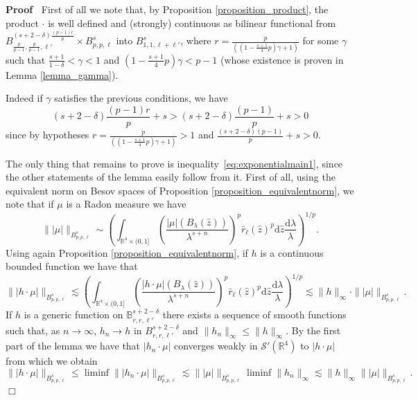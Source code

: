 \documentclass[a4paper,10pt]{article}
\newcommand{\mathd}{\mathrm{d}}
\newenvironment{proof}{\noindent\textbf{Proof\ }}{\hspace*{\fill}$\Box$\medskip}
\begin{document}
\begin{proof}
  First of all we note that, by Proposition \ref{proposition_product}, the
  product $\cdot$ is well defined and (strongly) continuous as bilinear
  functional from $B^{(s + 2 - \delta) \frac{(p - 1) r}{p}}_{\frac{p}{p - 1},
  \frac{p}{p - 1}, \ell'} \times B^s_{p, p, \ell}$ into $B^s_{1, 1, \ell +
  \ell'}$, where $r = \frac{p}{\left( \left( 1 - \frac{s + 1}{4} p \right)
  \gamma + 1 \right)}$ for some $\gamma$ such that $\frac{s + 1}{1 - \delta} <
  \gamma < 1$ and $\left( 1 - \frac{s + 1}{4} p \right) \gamma < p - 1$ (whose
  existence is proven in Lemma \ref{lemma_gamma}).
  
  Indeed if $\gamma$ satisfies the previous conditions, we have
  \[ (s + 2 - \delta) \frac{(p - 1) r}{p} + s > (s + 2 - \delta) \frac{(p -
     1)}{p} + s > 0 \]
  since by hypotheses $r = \frac{p}{\left( \left( 1 - \frac{s + 1}{4} p
  \right) \gamma + 1 \right)} > 1$ and $\frac{(s + 2 - \delta) (p - 1)}{p} + s
  > 0$.
  
  The only thing that remains to prove is
  inequality~{\eqref{eq:exponentialmain1}}, since the other statements of the
  lemma easily follow from it. First of all, using the equivalent norm on
  Besov spaces of Proposition \ref{proposition_equivalentnorm}, we note that
  if $\mu$ is a Radon measure we have
  \[ \| | \mu | \|_{B^s_{p, p, \ell}} \sim \left( \int_{\mathbb{R}^4 \times
     (0, 1]} \left( \frac{| \mu | (B_{\lambda} (\hat{z}))}{\lambda^{s + n}}
     \right)^p \bar{r}_{\ell} (\hat{z})^p \mathd \hat{z} \frac{\mathd
     \lambda}{\lambda} \right)^{1 / p} . \]
  Using again Proposition \ref{proposition_equivalentnorm}, if $h$ is a
  continuous bounded function we have that
  \[ \| | h \cdot \mu | \|_{B^s_{p, p, \ell}} \lesssim \left(
     \int_{\mathbb{R}^4 \times (0, 1]} \left( \frac{| h \cdot \mu |
     (B_{\lambda} (\hat{z}))}{\lambda^{s + n}} \right)^p \bar{r}_{\ell}
     (\hat{z})^p \mathd \hat{z} \frac{\mathd \lambda}{\lambda} \right)^{1 / p}
     \lesssim \| h \|_{\infty} \cdot \| | \mu | \|_{B^s_{p, p, \ell}} . \]
  If $h$ is a generic function on $\mathbb{B}^{s + 2 - \delta}_{r, r, \ell'}$
  there exists a sequence of smooth functions such that, as $n \rightarrow
  \infty$, $h_n \rightarrow h$ in $B^{s + 2 - \delta}_{r, r, \ell'}$ and $\|
  h_n \|_{\infty} \leqslant \| h \|_{\infty}$. By the first part of the lemma
  we have that $| h_n \cdot \mu |$ converges weakly in $\mathcal{S}'
  (\mathbb{R}^4)$ to $| h \cdot \mu |$ from which we obtain
  \[ \| | h \cdot \mu | \|_{B^s_{p, p, \ell}} \leqslant \liminf \| | h_n \cdot
     \mu | \|_{B^s_{p, p, \ell}} \lesssim \| | \mu | \|_{B^s_{p, p, \ell}}
     \liminf \| h_n \|_{\infty} \lesssim \| h \|_{\infty} \| | \mu |
     \|_{B^s_{p, p, \ell}} . \]
\end{proof}
\end{document}
